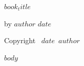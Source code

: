 \documentclass[12pt]{scrbook}
\def\booktitle{$book_title$}
\def\bookauthor{$author$}
\def\bookdate{$date$}
\begin{document}
\thispagestyle{empty}
\begin{center}
\vspace*{2in}
{\Huge\bfseries\booktitle\par}
\bigskip
by \bookauthor
\vfill
\bookdate
\end{center}

\clearpage
\thispagestyle{empty}
\vspace*{\fill}
Copyright \textcopyright\ \bookdate\ \bookauthor
\vspace*{\fill}

\tableofcontents

\mainmatter

$body$
\end{document}
